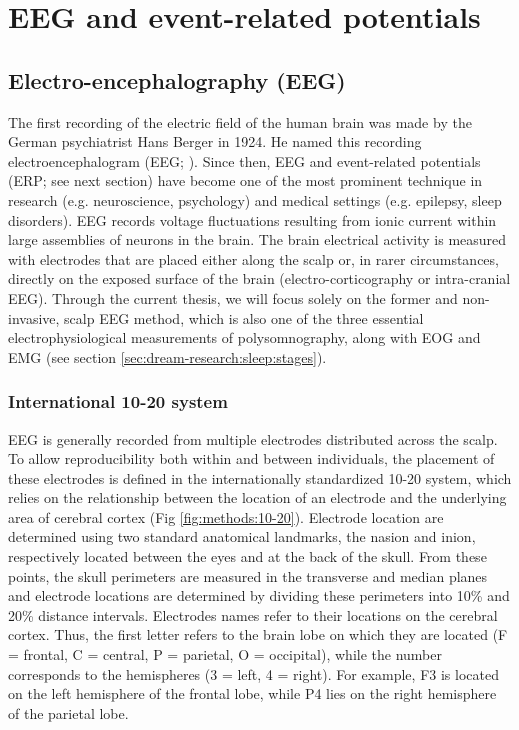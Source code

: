 \cleardoublepage

\chapter{EEG and event-related potentials}
\label{sec:eeg}

\section{Electro-encephalography (EEG)}
\label{sec:eeg:eeg}

The first recording of the electric field of the human brain was made by the German psychiatrist Hans Berger in 1924. He named this recording electroencephalogram (EEG; \citealp{berger_uber_1929}). Since then, EEG and event-related potentials (ERP; see next section) have become one of the most prominent technique in research (e.g. neuroscience, psychology) and medical settings (e.g. epilepsy, sleep disorders). EEG records voltage fluctuations resulting from ionic current within large assemblies of neurons in the brain. The brain electrical activity is measured with electrodes that are placed either along the scalp or, in rarer circumstances, directly on the exposed surface of the brain (electro-corticography or intra-cranial EEG). Through the current thesis, we will focus solely on the former and non-invasive, scalp EEG method, which is also one of the three essential electrophysiological measurements of polysomnography, along with EOG and EMG (see section \ref{sec:dream-research:sleep:stages}).

\subsection{International 10-20 system}
\label{sec:eeg:eeg:10-20}

EEG is generally recorded from multiple electrodes distributed across the scalp. To allow reproducibility both within and between individuals, the placement of these electrodes is defined in the internationally standardized 10-20 system, which relies on the relationship between the location of an electrode and the underlying area of cerebral cortex (Fig \ref{fig:methods:10-20}). Electrode location are determined using two standard anatomical landmarks, the nasion and inion, respectively located between the eyes and at the back of the skull. From these points, the skull perimeters are measured in the transverse and median planes and electrode locations are determined by dividing these perimeters into 10\% and 20\% distance intervals. Electrodes names refer to their locations on the cerebral cortex. Thus, the first letter refers to the brain lobe on which they are located (F = frontal, C = central, P = parietal, O = occipital), while the number corresponds to the hemispheres (3 = left, 4 = right). For example, F3 is located on the left hemisphere of the frontal lobe, while P4 lies on the right hemisphere of the parietal lobe.

